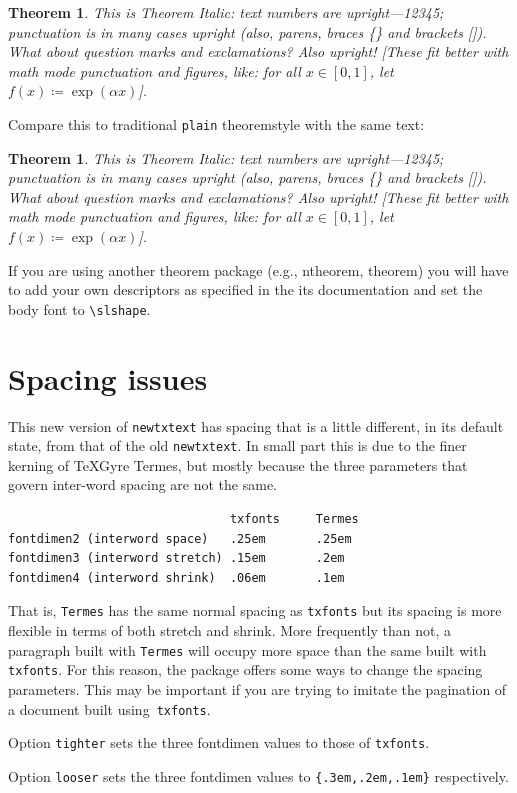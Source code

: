 \documentclass[11pt]{article}
\theoremstyle{oldplain}
\newtheorem{oldthm}{Theorem}[section]
\theoremstyle{plain}
\newtheorem{thm}{Theorem}[section]
\begin{document}
\begin{thm}
This is Theorem Italic: text numbers are upright---12345; punctuation is in many cases upright (also, parens, braces \{\} and brackets []). What about question marks and exclamations? Also upright! [These fit better with math mode punctuation and figures, like: for all $x\in[0,1]$, let $f(x)\coloneq \exp(\alpha x)$].
\end{thm}
Compare this to traditional {\tt plain} theoremstyle with the same text:
\begin{oldthm}
This is Theorem Italic: text numbers are upright---12345; punctuation is in many cases upright (also, parens, braces \{\} and brackets []). What about question marks and exclamations? Also upright! [These fit better with math mode punctuation and figures, like: for all $x\in[0,1]$, let $f(x)\coloneq \exp(\alpha x)$].
\end{oldthm}

If you are using another theorem package (e.g., ntheorem, theorem) you will have to add your own descriptors as specified in the its documentation and set the body font to \verb|\slshape|.

\section{Spacing issues}
This new version of {\tt newtxtext} has spacing that is a little different, in its default state, from that of the old {\tt newtxtext}. In small part this is due to the finer kerning of TeXGyre Termes, but mostly because the three parameters that govern inter-word spacing are not the same.
\begin{verbatim}
                               txfonts     Termes
fontdimen2 (interword space)   .25em       .25em
fontdimen3 (interword stretch) .15em       .2em
fontdimen4 (interword shrink)  .06em       .1em
\end{verbatim}
That is, {\tt Termes} has the same normal spacing as {\tt txfonts} but its spacing is more flexible in terms of both stretch and shrink. More frequently than not, a paragraph built with {\tt Termes} will occupy more space than the same built with {\tt txfonts}. For this reason, the package offers some ways to change the spacing parameters. This may be important if you are trying to imitate the pagination of a document built using~{\tt txfonts}.

Option {\tt tighter} sets the three fontdimen values to those of {\tt txfonts}.  

Option {\tt looser} sets the three fontdimen values to \verb|{.3em,.2em,.1em}| respectively. 
\end{document}
